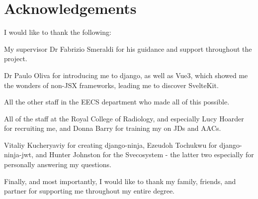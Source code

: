 \section*{\centering Acknowledgements}

I would like to thank the following:

My supervisor Dr Fabrizio Smeraldi for his guidance and support throughout the project.

Dr Paulo Oliva for introducing me to django, as well as Vue3, which showed me the wonders of non-JSX frameworks, leading me to discover SvelteKit. 

All the other staff in the EECS department who made all of this possible. 

All of the staff at the Royal College of Radiology, and especially Lucy Hoarder for recruiting me, and Donna Barry for training my on JDs and AACs.

Vitaliy Kucheryaviy for creating django-ninja, Ezeudoh Tochukwu for django-ninja-jwt, and Hunter Johnston for the Svecosystem - the latter two especially for personally answering my questions.

Finally, and most importantly, I would like to thank my family, friends, and partner for supporting me throughout my entire degree.

